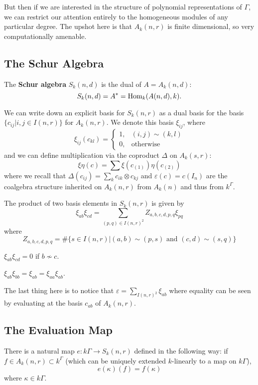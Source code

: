 \documentclass[12pt]{article}
\DeclareMathOperator{\1}{\mathbbm{1}}
\begin{document}
But then if we are interested in the structure of polynomial representations of $\Gamma$, we can restrict our attention entirely to the homogeneous modules
of any particular degree. The upshot here is that $A_k(n,r)$ is finite dimensional, so very computationally amenable.

\subsection{The Schur Algebra}
\begin{defn}
	The \textbf{Schur algebra} $S_k(n,d)$ is the dual of $A=A_k(n,d):$
	\[S_k(n,d)=A^\ast=\operatorname{Hom}_k(A(n,d),k).\]
\end{defn}

We can write down an explicit basis for $S_k(n,r)$ as a dual basis for the basis $\{c_{ij}|i,j\in I(n,r)\}$ for $A_k(n,r)$. We denote this basis $\xi_{ij}$, where 
\[\xi_{ij}(c_{kl})=\begin{cases}
	1,& (i,j)\sim (k,l)\\
	0,&\text{otherwise}
\end{cases}\]
and we can define multiplication via the coproduct $\Delta$ on $A_k(s,r)$:
\[\xi\eta(c)=\sum \xi(c_{(1)})\eta(c_{(2)})\]
where we recall that $\Delta(c_{ij})=\sum_k c_{ik}\otimes c_{kj}$ and $\varepsilon(c)=c(I_n)$ are the coalgebra structure inherited on $A_k(n,r)$ 
from $A_k(n)$ and thus from $k^\Gamma$.

\begin{prop}
	The product of two basis elements in $S_k(n,r)$ is given by 
	\[\xi_{ab}\xi_{cd}=\sum_{(p,q)\in I(n,r)^2}Z_{a,b,c,d,p,q}\xi_{pq}\]
	where 
	\[Z_{a,b,c,d,p,q}=\#\{s\in I(n,r)|(a,b)\sim(p,s)\text{ and }(c,d)\sim(s,q)\}\]
\end{prop}
\begin{cor}
	$\xi_{ab}\xi_{cd}=0$ if $b\not\sim c$.
\end{cor}
\begin{cor}
	$\xi_{ab}\xi_{bb}=\xi_{ab}=\xi_{aa}\xi_{ab}$.
\end{cor}

The last thing here is to notice that $\varepsilon=\sum_{I(n,r)^2}\xi_{ab}$ where equality can be seen by evaluating at the basis $c_{ab}$ of $A_k(n,r)$.

\subsection{The Evaluation Map}
There is a natural map $e:k\Gamma\to S_k(n,r)$ defined in the following way: if $f\in A_k(n,r)\subset k^\Gamma$ (which can be uniquely extended $k$-linearly 
to a map on $k\Gamma$),
\[e(\kappa)(f)=f(\kappa)\]
where $\kappa\in k\Gamma$.
\end{document}
